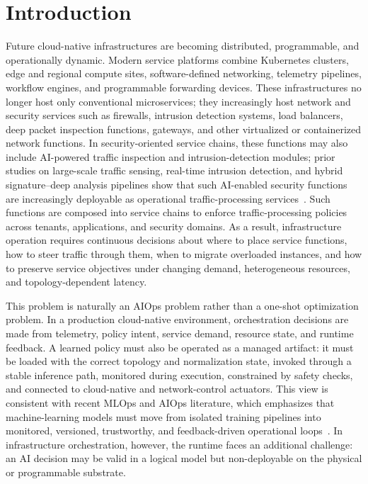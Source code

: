 \documentclass[final,5p]{elsarticle}
\begin{document}
\section{Introduction}
\label{sec:introduction}

Future cloud-native infrastructures are becoming distributed, programmable, and operationally dynamic. Modern service platforms combine Kubernetes clusters, edge and regional compute sites, software-defined networking, telemetry pipelines, workflow engines, and programmable forwarding devices. These infrastructures no longer host only conventional microservices; they increasingly host network and security services such as firewalls, intrusion detection systems, load balancers, deep packet inspection functions, gateways, and other virtualized or containerized network functions. In security-oriented service chains, these functions may also include AI-powered traffic inspection and intrusion-detection modules; prior studies on large-scale traffic sensing, real-time intrusion detection, and hybrid signature--deep analysis pipelines show that such AI-enabled security functions are increasingly deployable as operational traffic-processing services~\cite{jSAID23,jAPELID24,cSDAID22}. Such functions are composed into service chains to enforce traffic-processing policies across tenants, applications, and security domains. As a result, infrastructure operation requires continuous decisions about where to place service functions, how to steer traffic through them, when to migrate overloaded instances, and how to preserve service objectives under changing demand, heterogeneous resources, and topology-dependent latency.

This problem is naturally an AIOps problem rather than a one-shot optimization problem. In a production cloud-native environment, orchestration decisions are made from telemetry, policy intent, service demand, resource state, and runtime feedback. A learned policy must also be operated as a managed artifact: it must be loaded with the correct topology and normalization state, invoked through a stable inference path, monitored during execution, constrained by safety checks, and connected to cloud-native and network-control actuators. This view is consistent with recent MLOps and AIOps literature, which emphasizes that machine-learning models must move from isolated training pipelines into monitored, versioned, trustworthy, and feedback-driven operational loops~\cite{kreuzberger2023mlops,diazdearcaya2024joint,eken2025mlops,bayram2025trustworthy,zhang2025aiopsllm,eramo2024architecture}. In infrastructure orchestration, however, the runtime faces an additional challenge: an AI decision may be valid in a logical model but non-deployable on the physical or programmable substrate.
\end{document}
